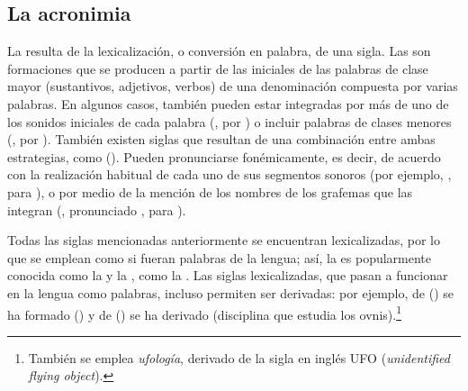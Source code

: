 \subsection{La acronimia}

La  resulta de la lexicalización, o conversión en palabra, de
una sigla. Las  son formaciones que se producen a partir de las
iniciales de las palabras de clase mayor (sustantivos, adjetivos, verbos) de una
denominación compuesta por varias palabras. En algunos casos, también pueden
estar integradas por más de uno de los sonidos iniciales de cada palabra
(, por ) o incluir
palabras de clases menores (, por ). También existen siglas que resultan de una combinación entre
ambas estrategias, como  ().
Pueden pronunciarse fonémicamente, es decir, de acuerdo con la realización
habitual de cada uno de sus segmentos sonoros (por ejemplo, , para
), o por medio de la mención de
los nombres de los grafemas que las integran (, pronunciado
, para ).

Todas las siglas mencionadas anteriormente se encuentran lexicalizadas, por lo
que se emplean como si fueran palabras de la lengua; así, la  es popularmente conocida como la  y la
, como la . Las siglas
lexicalizadas, que pasan a funcionar en la lengua como palabras, incluso
permiten ser derivadas: por ejemplo, de  () se ha formado  () y de  () se ha derivado  (disciplina que estudia los
ovnis).\footnote{También se emplea \textit{ufología}, derivado de la sigla en
inglés UFO (\textit{unidentified flying object}).}

